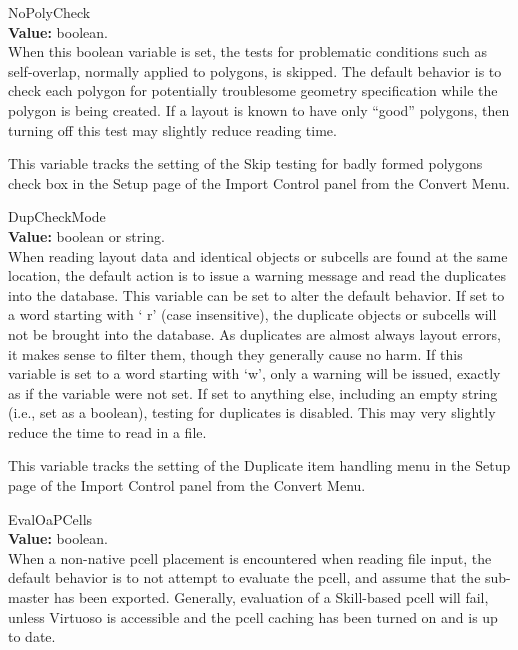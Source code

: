 \begin{description}
\item{\et NoPolyCheck}\\
{\bf Value:} boolean.\\
When this boolean variable is set, the tests for problematic
conditions such as self-overlap, normally applied to polygons, is
skipped.  The default behavior is to check each polygon for
potentially troublesome geometry specification while the polygon is
being created.  If a layout is known to have only ``good'' polygons,
then turning off this test may slightly reduce reading time.

This variable tracks the setting of the {\cb Skip testing for badly
formed polygons} check box in the {\cb Setup} page of the {\cb Import
Control} panel from the {\cb Convert Menu}.

\item{\et DupCheckMode}\\
{\bf Value:} boolean or string.\\
When reading layout data and identical objects or subcells are found
at the same location, the default action is to issue a warning message
and read the duplicates into the database.  This variable can be set
to alter the default behavior.  If set to a word starting with `{\vt
r}' (case insensitive), the duplicate objects or subcells will not be
brought into the database.  As duplicates are almost always layout
errors, it makes sense to filter them, though they generally cause no
harm.  If this variable is set to a word starting with `{\vt w}', only
a warning will be issued, exactly as if the variable were not set.  If
set to anything else, including an empty string (i.e., set as a
boolean), testing for duplicates is disabled.  This may very slightly
reduce the time to read in a file.

This variable tracks the setting of the {\cb Duplicate item handling}
menu in the {\cb Setup} page of the {\cb Import Control} panel from
the {\cb Convert Menu}.

\item{\et EvalOaPCells}\\
{\bf Value:} boolean.\\
When a non-native pcell placement is encountered when reading file
input, the default behavior is to not attempt to evaluate the pcell,
and assume that the sub-master has been exported.  Generally,
evaluation of a Skill-based pcell will fail, unless Virtuoso is
accessible and the pcell caching has been turned on and is up to date.
 

\end{description}
